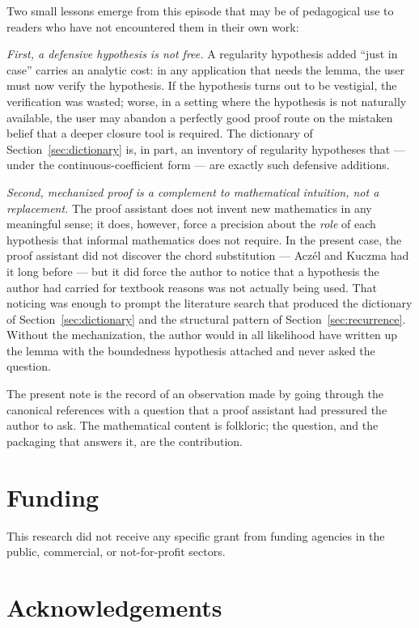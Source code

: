 \documentclass[review,12pt,a4paper]{elsarticle}
\theoremstyle{remark}
\begin{document}
Two small lessons emerge from this episode that may be of pedagogical
use to readers who have not encountered them in their own work:

\emph{First, a defensive hypothesis is not free.} A regularity
hypothesis added ``just in case'' carries an analytic cost: in any
application that needs the lemma, the user must now verify the
hypothesis. If the hypothesis turns out to be vestigial, the verification
was wasted; worse, in a setting where the hypothesis is not naturally
available, the user may abandon a perfectly good proof route on the
mistaken belief that a deeper closure tool is required. The dictionary
of Section~\ref{sec:dictionary} is, in part, an inventory of regularity
hypotheses that --- under the continuous-coefficient form --- are
exactly such defensive additions.

\emph{Second, mechanized proof is a complement to mathematical
intuition, not a replacement.} The proof assistant does not invent new
mathematics in any meaningful sense; it does, however, force a precision
about the \emph{role} of each hypothesis that informal mathematics does
not require. In the present case, the proof assistant did not discover
the chord substitution --- Acz\'el and Kuczma had it long before --- but
it did force the author to notice that a hypothesis the author had
carried for textbook reasons was not actually being used. That noticing
was enough to prompt the literature search that produced the dictionary
of Section~\ref{sec:dictionary} and the structural pattern of
Section~\ref{sec:recurrence}. Without the mechanization, the author
would in all likelihood have written up the lemma with the boundedness
hypothesis attached and never asked the question.

The present note is the record of an observation made by going through
the canonical references with a question that a proof assistant had
pressured the author to ask. The mathematical content is folkloric; the
question, and the packaging that answers it, are the contribution.

\section*{Funding}

This research did not receive any specific grant from funding agencies in
the public, commercial, or not-for-profit sectors.

\section*{Acknowledgements}
\end{document}
